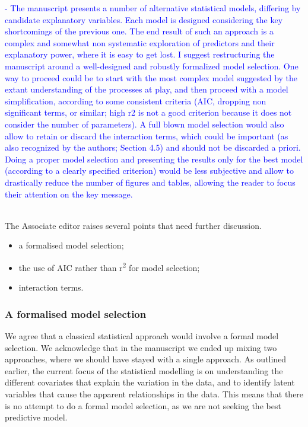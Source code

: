 \documentclass[]{elsarticle} %
\providecommand{\tightlist}{%
  \setlength{\itemsep}{0pt}\setlength{\parskip}{0pt}}
\begin{document}
\textcolor{blue}{- The manuscript presents a number of alternative statistical models, differing by candidate explanatory variables. Each model is designed considering the key shortcomings of the previous one. The end result of such an approach is a complex and somewhat non systematic exploration of predictors and their explanatory power, where it is easy to get lost. I suggest restructuring the manuscript around a well-designed and robustly formalized model selection. One way to proceed could be to start with the most complex model suggested by the extant understanding of the processes at play, and then proceed with a model simplification, according to some consistent criteria (AIC, dropping non significant terms, or similar; high r2 is not a good criterion because it does not consider the number of parameters). A full blown model selection would also allow to retain or discard the interaction terms, which could be important (as also recognized by the authors; Section 4.5) and should not be discarded a priori. Doing a proper model selection and presenting the results only for the best model (according to a clearly specified criterion) would be less subjective and allow to drastically reduce the number of figures and tables, allowing the reader to focus their attention on the key message.}\\
\strut \\
The Associate editor raises several points that need further discussion.

\begin{itemize}
\tightlist
\item
  a formalised model selection;\\
\item
  the use of AIC rather than r\textsuperscript{2} for model selection;\\
\item
  interaction terms.
\end{itemize}

\hypertarget{a-formalised-model-selection}{%
\subsubsection{A formalised model selection}\label{a-formalised-model-selection}}

We agree that a classical statistical approach would involve a formal model selection. We acknowledge that in the manuscript we ended up mixing two approaches, where we should have stayed with a single approach. As outlined earlier, the current focus of the statistical modelling is on understanding the different covariates that explain the variation in the data, and to identify latent variables that cause the apparent relationships in the data. This means that there is no attempt to do a formal model selection, as we are not seeking the best predictive model.
\end{document}
